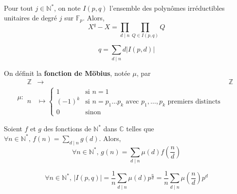 	\begin{theorem}
		Pour tout $j \in \mathbb{N}^*$, on note $I(p,q)$ l'ensemble des polynômes irréductibles unitaires de degré $j$ sur $\mathbb{F}_p$. Alors,
		\[ X^q - X = \prod_{d \mid n} \prod_{Q \in I(p,q)} Q \]
	\end{theorem}
	
	\begin{corollary}
		\[ q = \sum_{d \mid n} d \vert I(p,d) \vert \]
	\end{corollary}
	
	\begin{definition}
		On définit la \textbf{fonction de Möbius}, notée $\mu$, par
		\[
			\mu :
			\begin{array}{ccc}
				\mathbb{Z} &\rightarrow& \mathbb{Z} \\
				n &\mapsto \begin{cases}
					1 &\text{si } n = 1 \\
					(-1)^k &\text{si } n = p_1 \dots p_k \text{ avec } p_1, \dots, p_k \text{ premiers distincts} \\
					0 &\text{sinon}
				\end{cases}
			\end{array}
		\]
	\end{definition}
	
	\begin{theorem}
		Soient $f$ et $g$ des fonctions de $\mathbb{N}^*$ dans $\mathbb{C}$ telles que $\forall n \in \mathbb{N}^*, \, f(n) = \sum_{d \mid n} g(d)$. Alors,
		\[ \forall n \in \mathbb{N}^*, \, g(n) = \sum_{d \mid n} \mu(d) f \left( \frac{n}{d} \right) \]
	\end{theorem}
	
	\begin{corollary}
		\[ \forall n \in \mathbb{N}^*, \, \vert I(p,q) \vert = \frac{1}{n} \sum_{d \mid n} \mu(d) p^{\frac{n}{d}} = \frac{1}{n} \sum_{d \mid n} \mu \left( \frac{n}{d} \right) p^{d} \]
	\end{corollary}

